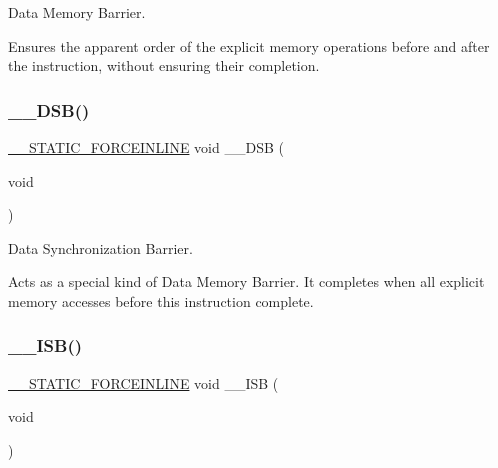 Data Memory Barrier. 

Ensures the apparent order of the explicit memory operations before and after the instruction, without ensuring their completion. \mbox{\label{group___c_m_s_i_s___core___instruction_interface_ga7fe277f5385d23b9c44b2cbda1577ce9}} 
\subsubsection{\texorpdfstring{\+\_\+\+\_\+\+D\+S\+B()}{\_\_DSB()}}
{\footnotesize\ttfamily \mbox{\hyperlink{cmsis__iccarm_8h_ab904513442afdf77d4f8c74f23cbb040}{\+\_\+\+\_\+\+S\+T\+A\+T\+I\+C\+\_\+\+F\+O\+R\+C\+E\+I\+N\+L\+I\+NE}} void \+\_\+\+\_\+\+D\+SB (\begin{DoxyParamCaption}\item[{void}]{ }\end{DoxyParamCaption})}



Data Synchronization Barrier. 

Acts as a special kind of Data Memory Barrier. It completes when all explicit memory accesses before this instruction complete. \mbox{\label{group___c_m_s_i_s___core___instruction_interface_gae26c2b3961e702aeabc24d4984ebd369}} 
\subsubsection{\texorpdfstring{\+\_\+\+\_\+\+I\+S\+B()}{\_\_ISB()}}
{\footnotesize\ttfamily \mbox{\hyperlink{cmsis__iccarm_8h_ab904513442afdf77d4f8c74f23cbb040}{\+\_\+\+\_\+\+S\+T\+A\+T\+I\+C\+\_\+\+F\+O\+R\+C\+E\+I\+N\+L\+I\+NE}} void \+\_\+\+\_\+\+I\+SB (\begin{DoxyParamCaption}\item[{void}]{ }\end{DoxyParamCaption})}



